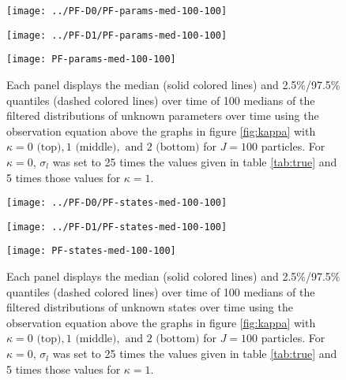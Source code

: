\documentclass{article}
\begin{document}
\begin{figure}[ht]
\begin{minipage}{1.1\linewidth}
\texttt{[image: ../PF-D0/PF-params-med-100-100]}
\end{minipage}
\begin{minipage}{1.1\linewidth}
\texttt{[image: ../PF-D1/PF-params-med-100-100]}
\end{minipage}
\begin{minipage}{1.1\linewidth}
\texttt{[image: PF-params-med-100-100]}
\end{minipage}
\caption{Each panel displays the median (solid colored lines) and 2.5\%/97.5\% quantiles (dashed colored lines) over time of 100 medians of the filtered distributions of unknown parameters over time using the observation equation above the graphs in figure \ref{fig:kappa} with $\kappa = 0 \mbox{ (top)}, 1 \mbox{ (middle)}, \mbox{ and } 2 \mbox{ (bottom)}$ for $J = 100$ particles. For $\kappa = 0$, $\sigma_l$ was set to 25 times the values given in table \ref{tab:true} and 5 times those values for $\kappa = 1$.}
\end{figure}

\begin{figure}[ht]
\begin{minipage}{1.0\linewidth}
\texttt{[image: ../PF-D0/PF-states-med-100-100]}
\end{minipage}
\begin{minipage}{1.0\linewidth}
\texttt{[image: ../PF-D1/PF-states-med-100-100]}
\end{minipage}
\begin{minipage}{1.0\linewidth}
\texttt{[image: PF-states-med-100-100]}
\end{minipage}
\caption{Each panel displays the median (solid colored lines) and 2.5\%/97.5\% quantiles (dashed colored lines) over time of 100 medians of the filtered distributions of unknown states over time using the observation equation above the graphs in figure \ref{fig:kappa} with $\kappa = 0 \mbox{ (top)}, 1 \mbox{ (middle)}, \mbox{ and } 2 \mbox{ (bottom)}$ for $J = 100$ particles. For $\kappa = 0$, $\sigma_l$ was set to 25 times the values given in table \ref{tab:true} and 5 times those values for $\kappa = 1$.}
\end{figure}
\end{document}
